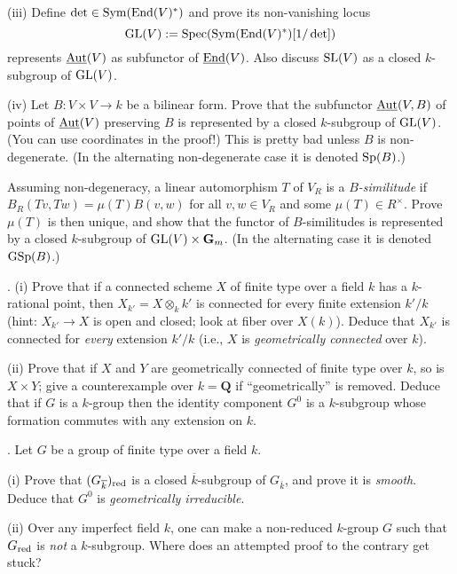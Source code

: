 \documentclass[10pt]{amsart}
\def\Spec{\mathop{\rm Spec}}
\begin{document}
(iii) Define $\det \in
{\rm{Sym}}({\rm{End}}(V)^{\ast})$ and prove its non-vanishing locus 
$${\rm{GL}}(V) := \Spec({\rm{Sym}}({\rm{End}}(V)^{\ast})[1/\det])$$ represents $\underline{\rm{Aut}}(V)$
as subfunctor of $\underline{\rm{End}}(V)$.
Also discuss ${\rm{SL}}(V)$ as a closed $k$-subgroup of
${\rm{GL}}(V)$.

(iv) Let $B:V \times V \rightarrow k$ be a bilinear form.
Prove that the subfunctor $\underline{\rm{Aut}}(V,B)$ of points of
$\underline{\rm{Aut}}(V)$ preserving $B$
is represented by a closed $k$-subgroup of ${\rm{GL}}(V)$.  (You can use coordinates
in the proof!)  This is pretty bad unless $B$ is non-degenerate.
(In the alternating non-degenerate case it is denoted ${\rm{Sp}}(B)$.) 

Assuming non-degeneracy, a linear automorphism $T$ of $V_R$ is 
a {\em $B$-similitude} if $B_R(Tv,Tw) = \mu(T)B(v,w)$ for all
$v, w \in V_R$ and some $\mu(T) \in R^{\times}$.  Prove $\mu(T)$ is then unique,
and show that the functor of $B$-similitudes is represented by a closed
$k$-subgroup of ${\rm{GL}}(V) \times {\mathbf{G}}_m$. (In the alternating case it is
denoted
${\rm{GSp}}(B)$.)  

\medskip{}. (i) Prove that if a connected scheme $X$ of finite type over a field $k$ has a $k$-rational point,
then $X_{k'} = X \otimes_k k'$ is connected for every finite extension $k'/k$
(hint: $X_{k'} \rightarrow X$ is open and closed; look at fiber over
$X(k)$).  Deduce that $X_{k'}$ is connected
for {\em every} extension $k'/k$ (i.e., $X$ is {\em geometrically connected} over $k$).

(ii) Prove that if $X$ and $Y$ are geometrically connected of finite type over $k$, so
is $X \times Y$; give a counterexample over $k = \mathbf{Q}$ if ``geometrically'' is removed.   
Deduce that if $G$ is a $k$-group then the identity component $G^0$
is a $k$-subgroup whose formation commutes with any extension on $k$. 

\medskip{}.  Let $G$ be a group of finite type over a field $k$.

(i) Prove that $(G_{\overline{k}})_{\rm{red}}$ is a closed $\overline{k}$-subgroup of
$G_{\overline{k}}$, and prove it is {\em smooth}. 
 Deduce that $G^0$ is {\em geometrically irreducible}.  
 
 (ii) Over any imperfect field $k$, one can make a non-reduced $k$-group $G$ such that
 $G_{\rm{red}}$ is {\em not} a $k$-subgroup.  Where does an attempted proof to the contrary get stuck?
\end{document}
